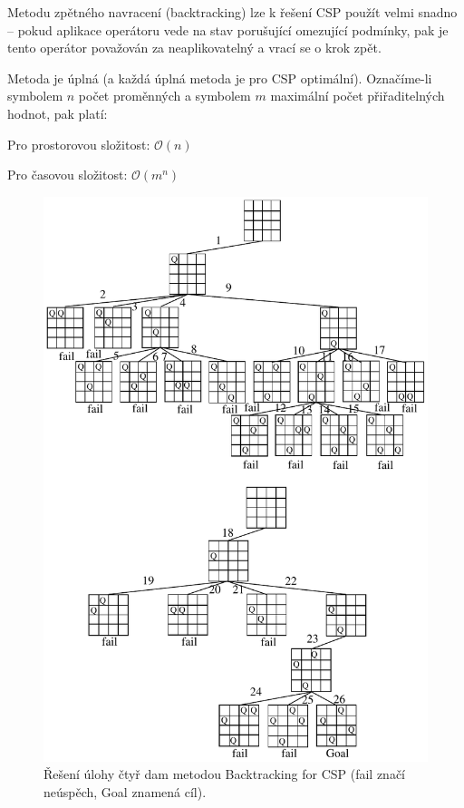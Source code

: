 \begin{compactitem}
    \item Metodu zpětného navracení (backtracking) lze k řešení CSP použít velmi snadno -- pokud aplikace operátoru vede na stav porušující omezující podmínky, pak je tento operátor považován za neaplikovatelný a vrací se o krok zpět.

    \item Metoda je úplná (a každá úplná metoda je pro CSP optimální). Označíme-li symbolem $n$ počet proměnných a symbolem $m$ maximální počet přiřaditelných hodnot, pak platí: \begin{compactitem}
        \item Pro prostorovou složitost: $\mathcal{O}(n)$
        \item Pro časovou složitost: $\mathcal{O}(m^n)$
    \end{compactitem}

    \begin{figure}[H]
        \centering
        \includegraphics[width=1\linewidth]{backtrack_csp.pdf}
        \caption{Řešení úlohy čtyř dam metodou Backtracking for CSP (fail značí neúspěch, Goal znamená cíl).}
    \end{figure}
\end{compactitem}

